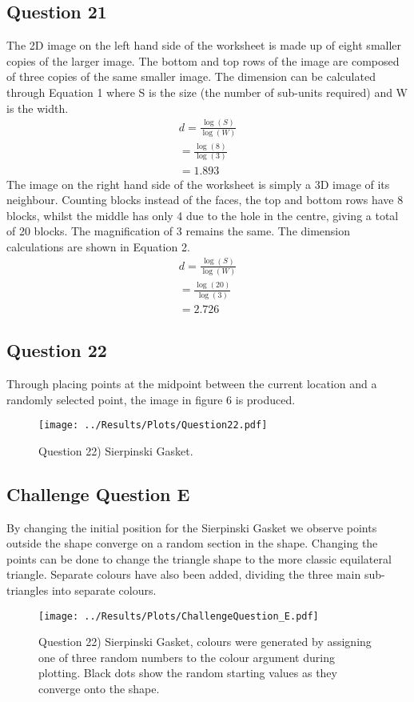 \documentclass[12pt]{article}
\begin{document}
	\subsection{Question 21}
	The 2D image on the left hand side of the worksheet is made up of eight smaller copies of the larger image. The bottom and top rows of the image are composed of three copies of the same smaller image. The dimension can be calculated through Equation 1 where S is the size (the number of sub-units required) and W is the width. 
    \begin{equation}
    \begin{split}
    	 d = \frac{\log(S)}{\log(W)} \\
	   	 = \frac{\log(8)}{\log(3)} \\
	   	 = 1.893
	\end{split}
    \end{equation}
    The image on the right hand side of the worksheet is simply a 3D image of its neighbour. Counting blocks instead of the faces, the top and bottom rows have 8 blocks, whilst the middle has only 4 due to the hole in the centre, giving a total of 20 blocks. The magnification of 3 remains the same. The dimension calculations are shown in Equation 2.
    \begin{equation}
    \begin{split}
	    d = \frac{\log(S)}{\log(W)} \\
	    = \frac{\log(20)}{\log(3)} \\
	    = 2.726
	\end{split}
    \end{equation}
    
    \subsection{Question 22}
    Through placing points at the midpoint between the current location and a randomly selected point, the image in figure 6 is produced.
    \begin{figure}[H]
    	\centering
    	\texttt{[image: ../Results/Plots/Question22.pdf]}
    	\caption{Question 22) Sierpinski Gasket.}
    \end{figure}

	\subsection{Challenge Question E}
	By changing the initial position for the Sierpinski Gasket we observe points outside the shape converge on a random section in the shape. Changing the points can be done to change the triangle shape to the more classic equilateral triangle. Separate colours have also been added, dividing the three main sub-triangles into separate colours.
	\begin{figure}[H]
		\centering
		\texttt{[image: ../Results/Plots/ChallengeQuestion\_E.pdf]}
		\caption{Question 22) Sierpinski Gasket, colours were generated by assigning one of three random numbers to the colour argument during plotting. Black dots show the random starting values as they converge onto the shape.}
	\end{figure}
	
\end{document}
